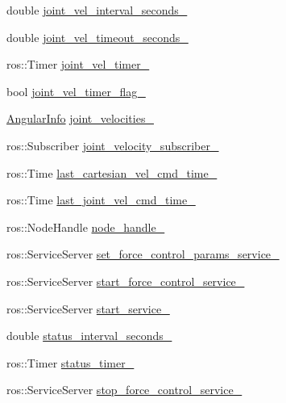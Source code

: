 \begin{DoxyCompactItemize}
\item 
double \hyperlink{classjaco_1_1JacoArm_a832938e80c91ce57ec241a1429133926}{joint\+\_\+vel\+\_\+interval\+\_\+seconds\+\_\+}
\item 
double \hyperlink{classjaco_1_1JacoArm_ac27941dace9da942beeff70926cc736e}{joint\+\_\+vel\+\_\+timeout\+\_\+seconds\+\_\+}
\item 
ros\+::\+Timer \hyperlink{classjaco_1_1JacoArm_ac4ad9c07f3a173e89d6767ec7a2dba12}{joint\+\_\+vel\+\_\+timer\+\_\+}
\item 
bool \hyperlink{classjaco_1_1JacoArm_a27effbbd66cd47378b49995cf80b8ffb}{joint\+\_\+vel\+\_\+timer\+\_\+flag\+\_\+}
\item 
\hyperlink{structAngularInfo}{Angular\+Info} \hyperlink{classjaco_1_1JacoArm_a640c8142aa9ab07ea9c2a3d7c5eb74cb}{joint\+\_\+velocities\+\_\+}
\item 
ros\+::\+Subscriber \hyperlink{classjaco_1_1JacoArm_a531289127704e9ffb5055cc58d3f90f8}{joint\+\_\+velocity\+\_\+subscriber\+\_\+}
\item 
ros\+::\+Time \hyperlink{classjaco_1_1JacoArm_a2ad620e8551ca62db4077135597b6618}{last\+\_\+cartesian\+\_\+vel\+\_\+cmd\+\_\+time\+\_\+}
\item 
ros\+::\+Time \hyperlink{classjaco_1_1JacoArm_a36758d949907e58807d6d4c3792a01df}{last\+\_\+joint\+\_\+vel\+\_\+cmd\+\_\+time\+\_\+}
\item 
ros\+::\+Node\+Handle \hyperlink{classjaco_1_1JacoArm_aa8b6a99580f2ccf8a5c509cc0f3b3c8e}{node\+\_\+handle\+\_\+}
\item 
ros\+::\+Service\+Server \hyperlink{classjaco_1_1JacoArm_a65f6584b95beb04af852cba7d953fdc3}{set\+\_\+force\+\_\+control\+\_\+params\+\_\+service\+\_\+}
\item 
ros\+::\+Service\+Server \hyperlink{classjaco_1_1JacoArm_aaf2a407b08e3982c463bbcf364be2dfa}{start\+\_\+force\+\_\+control\+\_\+service\+\_\+}
\item 
ros\+::\+Service\+Server \hyperlink{classjaco_1_1JacoArm_a7003937a11db04de838d05de05d29481}{start\+\_\+service\+\_\+}
\item 
double \hyperlink{classjaco_1_1JacoArm_aa44e18590ad8352a058df6abbd4a3c3b}{status\+\_\+interval\+\_\+seconds\+\_\+}
\item 
ros\+::\+Timer \hyperlink{classjaco_1_1JacoArm_ac11bbbecb7bebfef8b77d31b0294017a}{status\+\_\+timer\+\_\+}
\item 
ros\+::\+Service\+Server \hyperlink{classjaco_1_1JacoArm_af20526f276fc6708aacec52ca08ad189}{stop\+\_\+force\+\_\+control\+\_\+service\+\_\+}

\end{DoxyCompactItemize}
